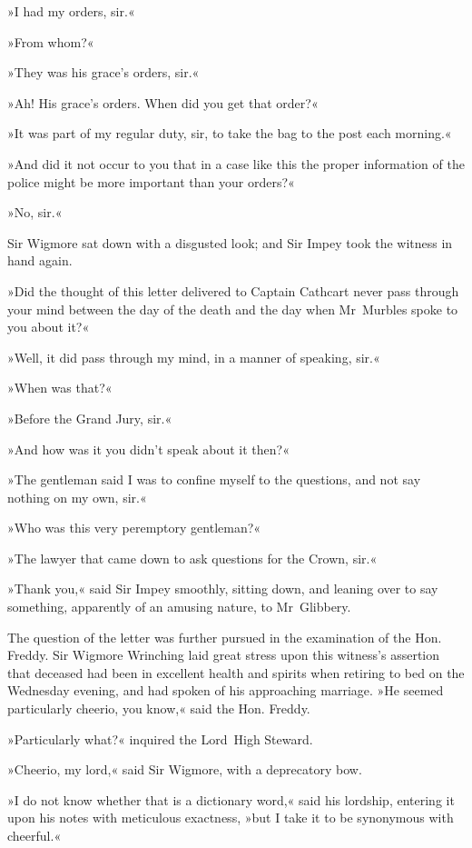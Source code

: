 »I had my orders, sir.«

»From whom?«

»They was his grace's orders, sir.«

»Ah! His grace's orders. When did you get that order?«

»It was part of my regular duty, sir, to take the bag to the post each morning.«

»And did it not occur to you that in a case like this the proper information of the police might be more important than your orders?«

»No, sir.«

Sir Wigmore sat down with a disgusted look; and Sir Impey took the witness in hand again.

»Did the thought of this letter delivered to Captain Cathcart never pass through your mind between the day of the death and the day when Mr~Murbles spoke to you about it?«

»Well, it did pass through my mind, in a manner of speaking, sir.«

»When was that?«

»Before the Grand Jury, sir.«

»And how was it you didn't speak about it then?«

»The gentleman said I was to confine myself to the questions, and not say nothing on my own, sir.«

»Who was this very peremptory gentleman?«

»The lawyer that came down to ask questions for the Crown, sir.«

»Thank you,« said Sir Impey smoothly, sitting down, and leaning over to say something, apparently of an amusing nature, to Mr~Glibbery.

The question of the letter was further pursued in the examination of the Hon. Freddy. Sir Wigmore Wrinching laid great stress upon this witness's assertion that deceased had been in excellent health and spirits when retiring to bed on the Wednesday evening, and had spoken of his approaching marriage. »He seemed particularly cheerio, you know,« said the Hon. Freddy.

»Particularly what?« inquired the Lord~High Steward.

»Cheerio, my lord,« said Sir Wigmore, with a deprecatory bow.

»I do not know whether that is a dictionary word,« said his lordship, entering it upon his notes with meticulous exactness, »but I take it to be synonymous with cheerful.«

